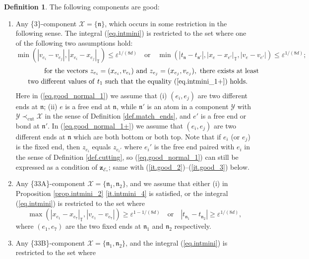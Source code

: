 \documentclass[10pt, reqno]{amsart}
\newcommand{\Tb}{\mathbb T}
\newcommand{\Ec}{\mathcal E}
\newcommand{\Xc}{\mathcal X}
\newcommand{\Yc}{\mathcal Y}
\newcommand{\nf}{\mathfrak n}
\newcommand{\vz}{\boldsymbol{z}}
\theoremstyle{definition}
\newtheorem{definition}[theorem]{Definition}
\theoremstyle{remark}
\numberwithin{equation}{section}
\begin{document}
\begin{definition}
The following components are good:
\begin{enumerate}[resume]
\item\label{it.good_1} Any \{3\}-component $\Xc=\{\nf\}$, which occurs in some restriction in the following sense. The integral (\ref{eq.intmini}) is restricted to the set where one of the following two assumptions hold:
\begin{equation}\label{eq.good_normal_1}\min(|v_{e_i}-v_{e_j}|,|x_{e_i}-x_{e_j}|_\Tb)\leq\varepsilon^{1/(8d)}\quad\mathrm{or}\quad \min(|t_\nf-t_{\nf'}|,|x_e-x_{e'}|_\Tb,|v_e-v_{e'}|)\leq\varepsilon^{1/(8d)};
\end{equation}
\begin{multline}\label{eq.good_normal_1+}\qquad\qquad\mathrm{for\ the\ vectors\ }z_{e_i}=(x_{e_i},v_{e_i})\mathrm{\ and\ }z_{e_j}=(x_{e_j},v_{e_j}),\mathrm{\ there\ exists\ at\ least}\\ \mathrm{two\ different\ values\ of\ }
t_1\mathrm{\ such\ that\ the\ equality\ }(\ref{eq.intmini_1+})\mathrm{\ holds}.
\end{multline}
Here in (\ref{eq.good_normal_1}) we assume that (i) $(e_i,e_j)$ are two different ends at $\nf$; (ii) $e$ is a free end at $\nf$, while $\nf'$ is an atom in a component $\Yc$ with $\Yc\prec_{\mathrm{cut}}\Xc$ in the sense of Definition \ref{def.match_ends}, and $e'$ is a free end or bond at $\nf'$. In (\ref{eq.good_normal_1+}) we assume that $(e_i,e_j)$ are two different ends at $\nf$ which are both bottom or both top. Note that if $e_i$ (or $e_j$) is the fixed end, then $z_{e_i}$ equals $z_{e_i'}$ where $e_i'$ is the free end paired with $e_i$ in the sense of Definition \ref{def.cutting}, so (\ref{eq.good_normal_1}) can still be expressed as a condition of $\vz_{\Ec_*}$; same with (\ref{it.good_2})--(\ref{it.good_3}) below.
\item\label{it.good_2} Any \{33A\}-component $\Xc=\{\nf_1,\nf_2\}$, and we assume that either (i) in Proposition \ref{prop.intmini_2} \ref{it.intmini_4} is satisfied, or the integral (\ref{eq.intmini}) is restricted to the set where
\begin{equation}\label{eq.good_normal_2}\max(|x_{e_1}-x_{e_7}|_\Tb,|v_{e_1}-v_{e_7}|)\geq\varepsilon^{1-1/(8d)}\quad\mathrm{or}\quad|t_{\nf_1}-t_{\nf_2}|\geq\varepsilon^{1/(8d)},
\end{equation} where $(e_1,e_7)$ are the two fixed ends at $\nf_1$ and $\nf_2$ respectively.
\item\label{it.good_33B} Any \{33B\}-component $\Xc=\{\nf_1,\nf_2\}$, and the integral (\ref{eq.intmini}) is restricted to the set where

\end{enumerate}
\end{definition}
\end{document}
